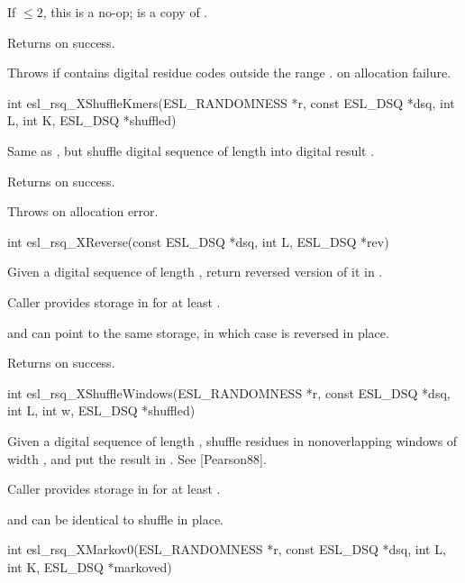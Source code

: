 \begin{sreapi}
If  $\leq 2$, this is a no-op;  is a copy of .

Returns  on success.

Throws  if  contains digital residue codes
outside the range .
 on allocation failure.


\hypertarget{func:esl_rsq_XShuffleKmers()}
{\item[int esl\_rsq\_XShuffleKmers(ESL\_RANDOMNESS *r, const ESL\_DSQ *dsq, int L, int K, ESL\_DSQ *shuffled)]}

Same as , but shuffle digital 
sequence  of length  into digital result .

Returns  on success.

Throws  on allocation error.


\hypertarget{func:esl_rsq_XReverse()}
{\item[int esl\_rsq\_XReverse(const ESL\_DSQ *dsq, int L, ESL\_DSQ *rev)]}

Given a digital sequence  of length , return
reversed version of it in . 

Caller provides storage in  for at least
.

 and  can point to the same storage, in which
case  is reversed in place.

Returns  on success.


\hypertarget{func:esl_rsq_XShuffleWindows()}
{\item[int esl\_rsq\_XShuffleWindows(ESL\_RANDOMNESS *r, const ESL\_DSQ *dsq, int L, int w, ESL\_DSQ *shuffled)]}

Given a digital sequence  of length , shuffle
residues in nonoverlapping windows of width , and put
the result in .  See [Pearson88].

Caller provides storage in  for at least
.

 and  can be identical to shuffle in place.



\hypertarget{func:esl_rsq_XMarkov0()}
{\item[int esl\_rsq\_XMarkov0(ESL\_RANDOMNESS *r, const ESL\_DSQ *dsq, int L, int K, ESL\_DSQ *markoved)]}


\end{sreapi}
